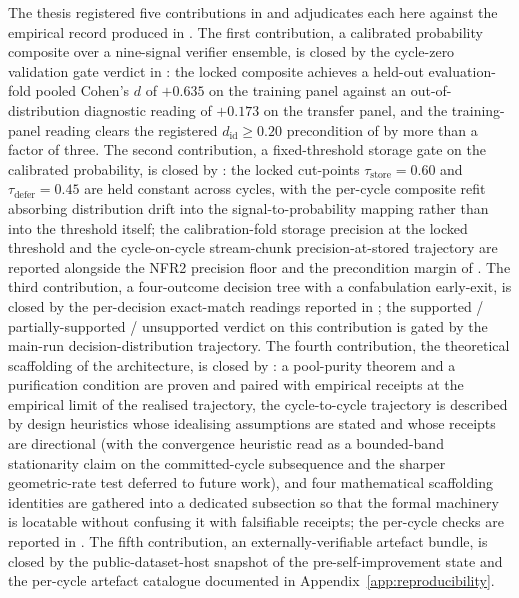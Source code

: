 The thesis registered five contributions in  and adjudicates each here against the empirical record produced in . The first contribution, a calibrated probability composite over a nine-signal verifier ensemble, is closed by the cycle-zero validation gate verdict in : the locked composite achieves a held-out evaluation-fold pooled Cohen's $d$ of $+0.635$ on the training panel against an out-of-distribution diagnostic reading of $+0.173$ on the transfer panel, and the training-panel reading clears the registered $d_{\text{id}} \ge 0.20$ precondition of  by more than a factor of three. The second contribution, a fixed-threshold storage gate on the calibrated probability, is closed by : the locked cut-points $\tau_{\text{store}} = 0.60$ and $\tau_{\text{defer}} = 0.45$ are held constant across cycles, with the per-cycle composite refit absorbing distribution drift into the signal-to-probability mapping rather than into the threshold itself; the calibration-fold storage precision at the locked threshold and the cycle-on-cycle stream-chunk precision-at-stored trajectory are reported alongside the NFR2 precision floor and the precondition margin of . The third contribution, a four-outcome decision tree with a confabulation early-exit, is closed by the per-decision exact-match readings reported in ; the supported / partially-supported / unsupported verdict on this contribution is gated by the main-run decision-distribution trajectory. The fourth contribution, the theoretical scaffolding of the architecture, is closed by : a pool-purity theorem and a purification condition are proven and paired with empirical receipts at the empirical limit of the realised trajectory, the cycle-to-cycle trajectory is described by design heuristics whose idealising assumptions are stated and whose receipts are directional (with the convergence heuristic read as a bounded-band stationarity claim on the committed-cycle subsequence and the sharper geometric-rate test deferred to future work), and four mathematical scaffolding identities are gathered into a dedicated subsection so that the formal machinery is locatable without confusing it with falsifiable receipts; the per-cycle checks are reported in . The fifth contribution, an externally-verifiable artefact bundle, is closed by the public-dataset-host snapshot of the pre-self-improvement state and the per-cycle artefact catalogue documented in Appendix~\ref{app:reproducibility}.

